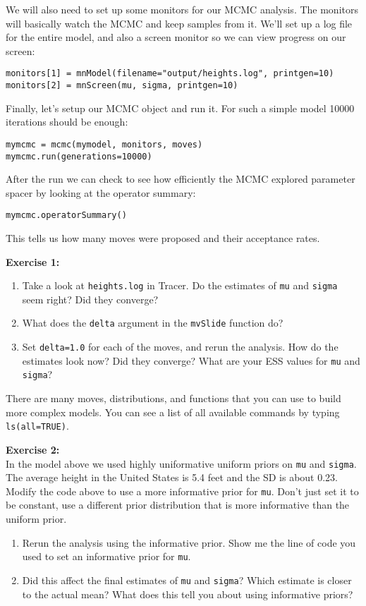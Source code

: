 \documentclass[11pt]{article}
\begin{document}
We will also need to set up some monitors for our MCMC analysis.
The monitors will basically watch the MCMC and keep samples from it.
We'll set up a log file for the entire model, and also a screen monitor
so we can view progress on our screen:
\begin{verbatim}
monitors[1] = mnModel(filename="output/heights.log", printgen=10)
monitors[2] = mnScreen(mu, sigma, printgen=10)
\end{verbatim}
Finally, let's setup our MCMC object and run it.
For such a simple model 10000 iterations should be enough:
\begin{verbatim}
mymcmc = mcmc(mymodel, monitors, moves)
mymcmc.run(generations=10000)
\end{verbatim}
After the run we can check to see how efficiently the MCMC explored parameter spacer
by looking at the operator summary:
\begin{verbatim}
mymcmc.operatorSummary()
\end{verbatim}
This tells us how many moves were proposed and their acceptance rates.

\begin{framed}
\noindent
\textbf{Exercise 1:} \\
\begin{enumerate}
\item Take a look at \texttt{heights.log} in Tracer.
    Do the estimates of \texttt{mu} and \texttt{sigma} seem right?
    Did they converge?
\item What does the \texttt{delta} argument in the \texttt{mvSlide}
      function do?
\item Set \texttt{delta=1.0} for each of the moves, and rerun the analysis.
      How do the estimates look now? Did they converge? What are your ESS
      values for \texttt{mu} and \texttt{sigma}?
\end{enumerate}
\end{framed}

There are many moves, distributions, and functions that you can use
to build more complex models.
You can see a list of all available commands by typing \texttt{ls(all=TRUE)}.

\begin{framed}
\noindent
\textbf{Exercise 2:} \\
In the model above we used highly uniformative uniform priors on
\texttt{mu} and \texttt{sigma}.
The average height in the United States is 5.4 feet and the SD is about 0.23.
Modify the code above to use a more informative prior
for \texttt{mu}. Don't just set
    it to be constant, use a different prior distribution that is more informative
    than the uniform prior.
\begin{enumerate}
    \item Rerun the analysis using the informative prior.
        Show me the line of code you used to set an informative
        prior for \texttt{mu}.
    \item Did this affect the final estimates of \texttt{mu} and \texttt{sigma}?
     Which estimate is closer to the actual mean?
     What does this tell you about using informative priors?
\end{enumerate}
\end{framed}
\end{document}
